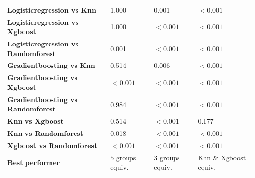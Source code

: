 \begin{table}[H]
{\begin{tabular}{llll}
        \textbf{Logisticregression vs Knn} & 1.000 & 0.001 & $< 0.001$ \\
        \textbf{Logisticregression vs Xgboost} & 1.000 & $< 0.001$ & $< 0.001$ \\
        \textbf{Logisticregression vs Randomforest} & 0.001 & $< 0.001$ & $< 0.001$ \\
        \textbf{Gradientboosting vs Knn} & 0.514 & 0.006 & $< 0.001$ \\
        \textbf{Gradientboosting vs Xgboost} & $< 0.001$ & $< 0.001$ & $< 0.001$ \\
        \textbf{Gradientboosting vs Randomforest} & 0.984 & $< 0.001$ & $< 0.001$ \\
        \textbf{Knn vs Xgboost} & 0.514 & $< 0.001$ & 0.177 \\
        \textbf{Knn vs Randomforest} & 0.018 & $< 0.001$ & $< 0.001$ \\
        \textbf{Xgboost vs Randomforest} & $< 0.001$ & $< 0.001$ & $< 0.001$ \\
        \textbf{Best performer} & 5 groups equiv. & 3 groups equiv. & Knn \& Xgboost equiv. \\
        \bottomrule
    \end{tabular}}
\end{table}